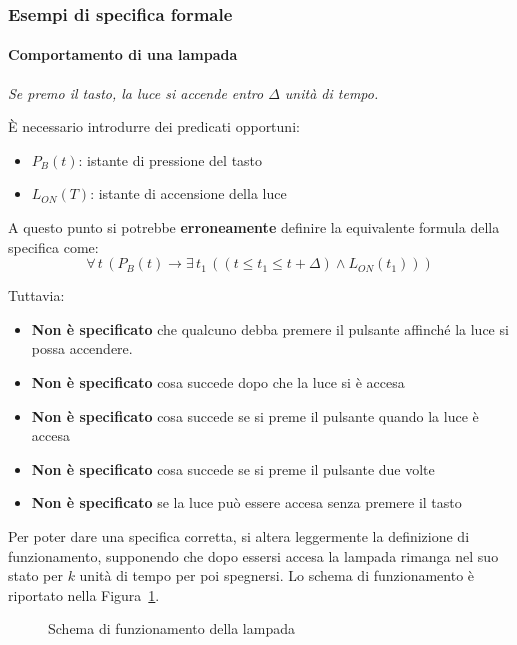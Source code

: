 \documentclass[italian, 10pt]{article}
\begin{document}
\subsubsection{Esempi di specifica formale}

\paragraph{Comportamento di una lampada}

\textit{Se premo il tasto, la luce si accende entro \(\Delta\) unità di tempo.}

È necessario introdurre dei predicati opportuni:

\begin{itemize}
  \item \(P_B(t)\): istante di pressione del tasto
  \item \(L_{ON}(T)\): istante di accensione della luce
\end{itemize}

A questo punto si potrebbe \textbf{erroneamente} definire la equivalente formula \FOL della specifica come:
\[\forall \, t \, (P_B(t) \rightarrow \exists \, t_1 \, ((t \leq t_1 \leq t + \Delta) \land L_{ON}(t_1)))\]

Tuttavia:
\begin{itemize}
  \item \textbf{Non è specificato} che qualcuno debba premere il pulsante affinché la luce si possa accendere.
  \item \textbf{Non è specificato} cosa succede dopo che la luce si è accesa
  \item \textbf{Non è specificato} cosa succede se si preme il pulsante quando la luce è accesa
  \item \textbf{Non è specificato} cosa succede se si preme il pulsante due volte
  \item \textbf{Non è specificato} se la luce può essere accesa senza premere il tasto
\end{itemize}

\bigskip
Per poter dare una specifica corretta, si altera leggermente la definizione di funzionamento, supponendo che dopo essersi accesa la lampada rimanga nel suo stato per \(k\) unità di tempo per poi spegnersi.
Lo schema di funzionamento è riportato nella Figura~\ref{fig:schema-funzionamento-lampada}.

\begin{figure}[htbp]
  \bigskip
  \centering
  \caption{Schema di funzionamento della lampada}
  \label{fig:schema-funzionamento-lampada}
  \bigskip
\end{figure}
\end{document}
